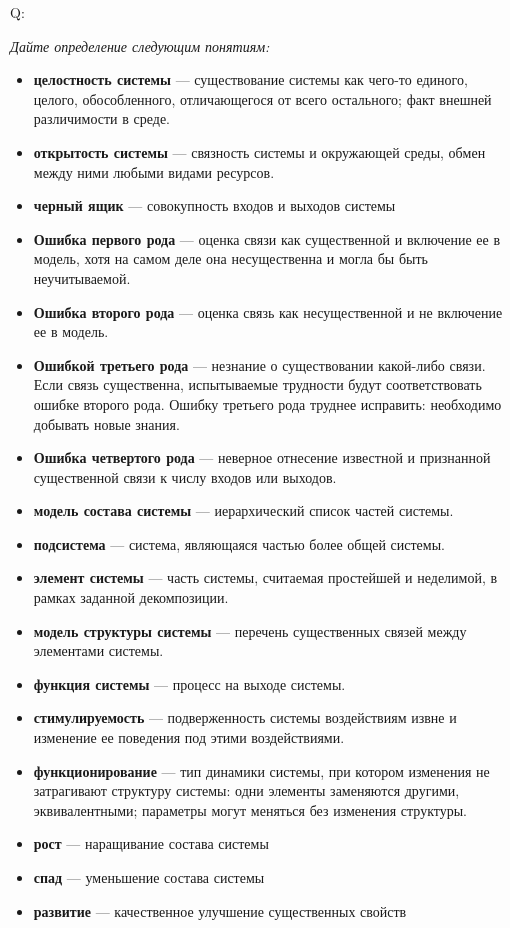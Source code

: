 \documentclass{article}
\newcommand{\define}[2]{
	\textbf{#1} --- #2
	}
\newcommand{\question}[2]{
	\begin{flushright}
		Q:\hspace{2ex}\vline\hspace{2ex}
		\begin{minipage}{0.9\textwidth}
			\large
			\textit{#1}
		\end{minipage}
	\end{flushright}
	\begin{center}
		\begin{minipage}{0.95\textwidth}
			#2
		\end{minipage}
	\end{center}
	}
\begin{document}
\question{Дайте определение следующим понятиям:}{
\begin{itemize}
	\item \define{целостность системы}{существование системы как чего-то единого, целого, обособленного, отличающегося от всего остального; факт внешней различимости в среде.}
	\item \define{открытость системы}{связность системы и окружающей среды, обмен между ними любыми видами ресурсов.}
	\item \define{черный ящик}{совокупность входов и выходов системы}
	\item \define{Ошибка первого рода}{оценка связи как существенной и включение ее в модель, хотя на самом деле она несущественна и могла бы быть неучитываемой.}
	\item \define{Ошибка второго рода}{оценка связь как несущественной и не включение ее в модель.}
	\item \define{Ошибкой третьего рода}{незнание о существовании какой-либо связи. Если связь существенна, испытываемые трудности будут соответствовать ошибке второго рода. Ошибку третьего рода труднее исправить: необходимо добывать новые знания.}
	\item \define{Ошибка четвертого рода}{неверное отнесение известной и признанной существенной связи к числу входов или выходов.}
	\item \define{модель состава системы}{иерархический список частей системы.}
	\item \define{подсистема}{система, являющаяся частью более общей системы.}
	\item \define{элемент системы}{часть системы, считаемая простейшей и неделимой, в рамках заданной декомпозиции.}
	\item \define{модель структуры системы}{перечень существенных связей между элементами системы.}
	\item \define{функция системы}{процесс на выходе системы.}
	\item \define{стимулируемость}{подверженность системы воздействиям извне и изменение ее поведения под этими воздействиями.}
	\item \define{функционирование}{тип динамики системы, при котором изменения не затрагивают структуру системы: одни элементы заменяются другими, эквивалентными; параметры могут меняться без изменения структуры.}
	\item \define{рост}{наращивание состава системы}
	\item \define{спад}{уменьшение состава системы}
	\item \define{развитие}{качественное улучшение существенных свойств}

\end{itemize}}
\end{document}
